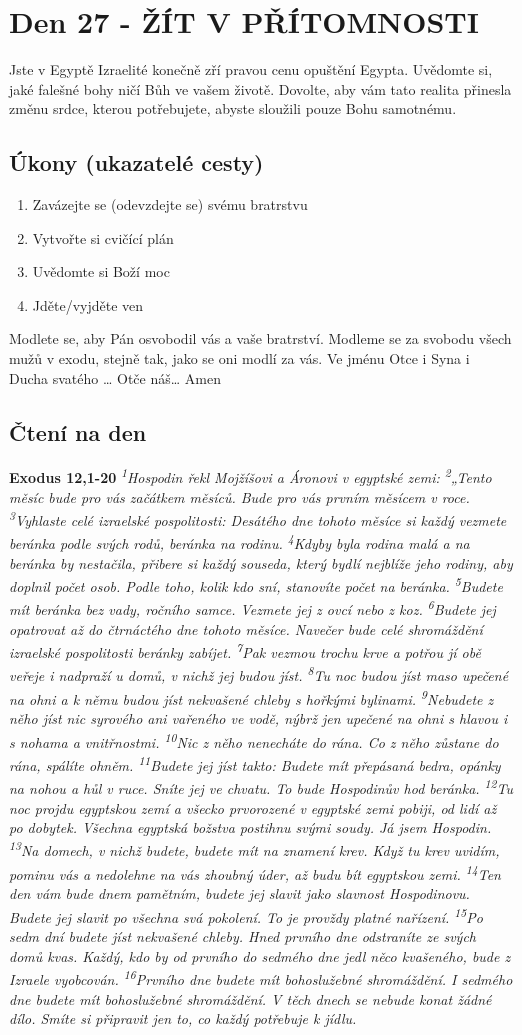 \documentclass[11pt]{article}
\newcommand{\zacatekCtvrtyTyden}{
  Jste v Egyptě \newline
  Izraelité konečně zří pravou cenu opuštění Egypta. Uvědomte si, jaké falešné bohy ničí Bůh ve vašem životě.
Dovolte, aby vám tato realita přinesla změnu srdce, kterou potřebujete, abyste sloužili pouze Bohu samotnému.

\subsection*{Úkony (ukazatelé cesty)}
\begin{enumerate}
  \item Zavázejte se (odevzdejte se) svému bratrstvu
  \item Vytvořte si cvičící plán
  \item Uvědomte si Boží moc
  \item Jděte/vyjděte ven
\end{enumerate}
Modlete se, aby Pán osvobodil vás a vaše bratrství. \newline
Modleme se za svobodu všech mužů v exodu, stejně tak, jako se oni modlí za vás.\newline
Ve jménu Otce i Syna i Ducha svatého …  Otče náš… Amen
}
\begin{document}
\newpage
\section{Den 27 - ŽÍT V PŘÍTOMNOSTI}
\zacatekCtvrtyTyden
\subsection*{Čtení na den}
\textbf{Exodus 12,1-20}
\newline
\textit{
\textsuperscript{1}Hospodin řekl Mojžíšovi a Áronovi v egyptské zemi:
\textsuperscript{2}„Tento měsíc bude pro vás začátkem měsíců. Bude pro vás prvním měsícem v roce.
\textsuperscript{3}Vyhlaste celé izraelské pospolitosti: Desátého dne tohoto měsíce si každý vezmete beránka podle svých rodů, beránka na rodinu.
\textsuperscript{4}Kdyby byla rodina malá a na beránka by nestačila, přibere si každý souseda, který bydlí nejblíže jeho rodiny, aby doplnil počet osob. Podle toho, kolik kdo sní, stanovíte počet na beránka.
\textsuperscript{5}Budete mít beránka bez vady, ročního samce. Vezmete jej z ovcí nebo z koz.
\textsuperscript{6}Budete jej opatrovat až do čtrnáctého dne tohoto měsíce. Navečer bude celé shromáždění izraelské pospolitosti beránky zabíjet.
\textsuperscript{7}Pak vezmou trochu krve a potřou jí obě veřeje i nadpraží u domů, v nichž jej budou jíst.
\textsuperscript{8}Tu noc budou jíst maso upečené na ohni a k němu budou jíst nekvašené chleby s hořkými bylinami.
\textsuperscript{9}Nebudete z něho jíst nic syrového ani vařeného ve vodě, nýbrž jen upečené na ohni s hlavou i s nohama a vnitřnostmi.
\textsuperscript{10}Nic z něho nenecháte do rána. Co z něho zůstane do rána, spálíte ohněm.
\textsuperscript{11}Budete jej jíst takto: Budete mít přepásaná bedra, opánky na nohou a hůl v ruce. Sníte jej ve chvatu. To bude Hospodinův hod beránka.
\textsuperscript{12}Tu noc projdu egyptskou zemí a všecko prvorozené v egyptské zemi pobiji, od lidí až po dobytek. Všechna egyptská božstva postihnu svými soudy. Já jsem Hospodin.
\textsuperscript{13}Na domech, v nichž budete, budete mít na znamení krev. Když tu krev uvidím, pominu vás a nedolehne na vás zhoubný úder, až budu bít egyptskou zemi.
\textsuperscript{14}Ten den vám bude dnem pamětním, budete jej slavit jako slavnost Hospodinovu. Budete jej slavit po všechna svá pokolení. To je provždy platné nařízení.
\textsuperscript{15}Po sedm dní budete jíst nekvašené chleby. Hned prvního dne odstraníte ze svých domů kvas. Každý, kdo by od prvního do sedmého dne jedl něco kvašeného, bude z Izraele vyobcován.
\textsuperscript{16}Prvního dne budete mít bohoslužebné shromáždění. I sedmého dne budete mít bohoslužebné shromáždění. V těch dnech se nebude konat žádné dílo. Smíte si připravit jen to, co každý potřebuje k jídlu.
}
\end{document}
